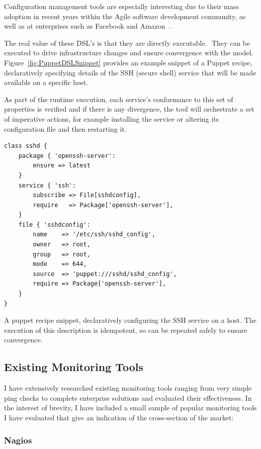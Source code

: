 \documentclass{cshonours}
\begin{document}
Configuration management tools are especially interesting due to their mass adoption in recent years within the Agile software development community, as well as at enterprises such as Facebook and Amazon~\cite{Chef}.

The real value of these DSL's is that they are directly executable.  They can be executed to drive infrastructure changes and ensure convergence with the model. Figure~\ref{fig:PuppetDSLSnippet} provides an example snippet of a Puppet recipe, declaratively specifying details of the SSH (secure shell) service that will be made available on a specific host.

As part of the runtime execution, each service's conformance to this set of properties is verified and if there is any divergence, the tool will orchestrate a set of imperative actions, for example installing the service or altering its configuration file and then restarting it.

\begin{listing}[h]
\begin{verbatim}
class sshd {
    package { 'openssh-server':
        ensure => latest
    }
    service { 'ssh':
        subscribe => File[sshdconfig],
        require   => Package['openssh-server'],
    }
    file { 'sshdconfig': 
        name    => '/etc/ssh/sshd_config',
        owner   => root,
        group   => root,
        mode    => 644,
        source  => 'puppet:///sshd/sshd_config',
        require => Package['openssh-server'],
    }
}
\end{verbatim}
\caption{A puppet recipe snippet, declaratively configuring the SSH service on a host. The execution of this description is idempotent, so can be repeated safely to ensure convergence.}
\label{fig:PuppetDSLSnippet}
\end{listing}

\clearpage
\subsection{Existing Monitoring Tools}

I have extensively researched existing monitoring tools ranging from very simple ping checks to complete enterprise solutions and evaluated their effectiveness. In the interest of brevity, I have included a small sample of popular monitoring tools I have evaluated that give an indication of the cross-section of the market:

\subsubsection{Nagios}
\end{document}
